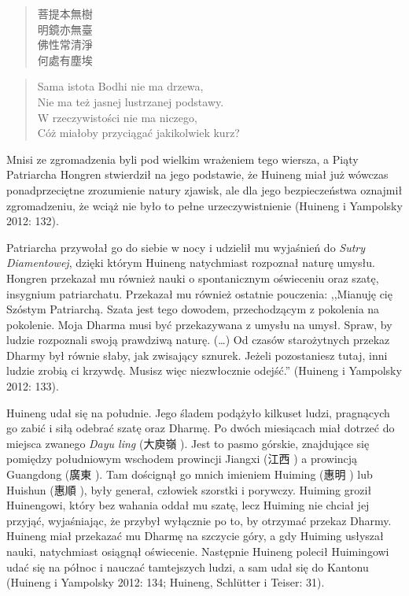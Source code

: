 \begin{minipage}[t]{0.38\textwidth}
\begin{verse}
菩提本無樹\\
明鏡亦無臺\\
佛性常清淨\\
何處有塵埃
\end{verse}
\end{minipage}
\begin{minipage}[t]{0.62\textwidth}
\itshape
\begin{verse}
Sama istota Bodhi nie ma drzewa,\\
Nie ma też jasnej lustrzanej podstawy.\\
W rzeczywistości nie ma niczego,\\
Cóż miałoby przyciągać jakikolwiek kurz?
\end{verse}
\end{minipage}
\label{HuinengVerse}
\vspace*{6pt}

Mnisi ze zgromadzenia byli pod wielkim wrażeniem tego wiersza, a Piąty Patriarcha Hongren stwierdził na jego podstawie, że Huineng miał już wówczas ponadprzeciętne zrozumienie natury zjawisk, ale dla jego bezpieczeństwa oznajmił zgromadzeniu, że wciąż nie było to pełne urzeczywistnienie
(Huineng i Yampolsky 2012: 132).

Patriarcha przywołał go do siebie w nocy i udzielił mu wyjaśnień do \textit{Sutry Diamentowej}, dzięki którym Huineng natychmiast rozpoznał naturę umysłu.
Hongren przekazał mu również nauki o spontanicznym oświeceniu oraz szatę, insygnium patriarchatu. Przekazał mu również ostatnie pouczenia: ,,Mianuję cię Szóstym Patriarchą. Szata jest tego dowodem, przechodzącym z pokolenia na pokolenie. Moja Dharma musi być przekazywana z umysłu na umysł. Spraw, by ludzie rozpoznali swoją prawdziwą naturę. (\ldots) Od czasów starożytnych przekaz Dharmy był równie słaby, jak zwisający sznurek. Jeżeli pozostaniesz tutaj, inni ludzie zrobią ci krzywdę. Musisz więc niezwłocznie odejść.'' (Huineng i Yampolsky 2012: 133).

Huineng udał się na południe. Jego śladem podążyło kilkuset ludzi, pragnących go zabić i siłą odebrać szatę oraz Dharmę. Po dwóch miesiącach miał dotrzeć do miejsca zwanego \textit{Dayu ling} (大庾嶺 ). Jest to pasmo górskie, znajdujące się pomiędzy południowym wschodem prowincji Jiangxi (江西 ) a prowincją Guangdong (廣東 ). Tam doścignął go mnich imieniem Huiming (惠明 ) lub Huishun (惠順 ), były generał, człowiek szorstki i porywczy. Huiming groził Huinengowi, który bez wahania oddał mu szatę, lecz Huiming nie chciał jej przyjąć, wyjaśniając, że przybył wyłącznie po to, by otrzymać przekaz Dharmy. Huineng miał przekazać mu Dharmę na szczycie góry, a gdy Huiming usłyszał nauki, natychmiast osiągnął oświecenie.
Następnie Huineng polecił Huimingowi udać się na północ i nauczać tamtejszych ludzi, a sam udał się do Kantonu (Huineng i Yampolsky 2012: 134; Huineng, Schlütter i Teiser: 31).

